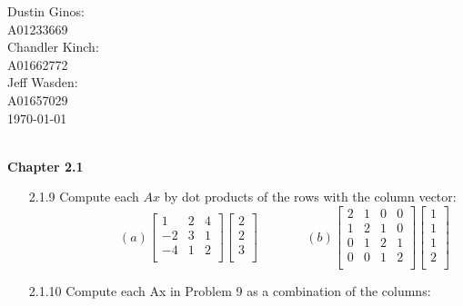 \documentclass[10pt,twoside,reqno]{article}
\begin{document}
\begin{flushright}
\begin{minipage}{.25\textwidth}
Dustin Ginos: \\
A01233669\\
Chandler Kinch: \\
A01662772\\
Jeff Wasden: \\
A01657029\\

\today
\end{minipage}
\end{flushright}

\\
\vspace{5mm}
\textbf{Chapter 2.1}
\begin{enumerate}
\item[2.1.9]Compute each $Ax$ by dot products of the rows with the column vector: \\
\vspace{3mm}
$
$$
\hspace{85pt}
(a) 
\begin{bmatrix}
1&2&4\\
-2&3&1\\
-4&1&2\\
\end{bmatrix}
\begin{bmatrix}
2\\
2\\
3\\
\end{bmatrix}
\hspace{45pt}
(b) 
\begin{bmatrix}
2&1&0&0\\
1&2&1&0\\
0&1&2&1\\
0&0&1&2\\
\end{bmatrix}
\begin{bmatrix}
1\\
1\\
1\\
2\\
\end{bmatrix}
$$
$\\
\vspace{3mm}
\item[2.1.10]Compute each Ax in Problem 9 as a combination of the columns: \\

\end{enumerate}
\end{document}

